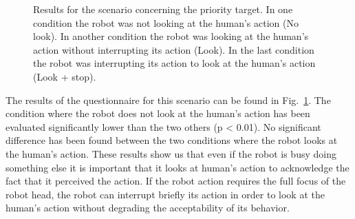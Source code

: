 \documentclass[english,a4paper,11pt,twoside]{StyleThese}
\begin{document}
\begin{figure}[!h]
\centering
    \caption{Results for the scenario concerning the priority target. In one condition the robot was not looking at the human's action (No look). In another condition the robot was looking at the human's action without interrupting its action (Look). In the last condition the robot was interrupting its action to look at the human's action (Look + stop).}
    \label{fig:resSce6}
\end{figure}

The results of the questionnaire for this scenario can be found in Fig.~\ref{fig:resSce6}. The condition where the robot does not look at the human's action has been evaluated significantly lower than the two others (p < 0.01). No significant difference has been found between the two conditions where the robot looks at the human's action. These results show us that even if the robot is busy doing something else it is important that it looks at human's action to acknowledge the fact that it perceived the action. If the robot action requires the full focus of the robot head, the robot can interrupt briefly its action in order to look at the human's action without degrading the acceptability of its behavior.
\end{document}
